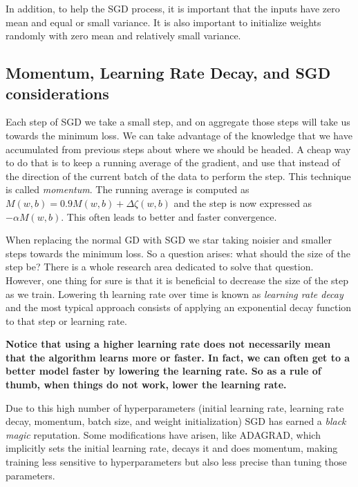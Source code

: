 \documentclass[english, 11pt]{article}
\begin{document}
	In addition, to help the \ac{SGD} process, it is important that the inputs have zero mean and equal or small variance. It is also important to initialize weights randomly with zero mean and relatively small variance.

	\subsection{Momentum, Learning Rate Decay, and SGD considerations}

	Each step of \ac{SGD} we take a small step, and on aggregate those steps will take us towards the minimum loss. We can take advantage of the knowledge that we have accumulated from previous steps about where we should be headed. A cheap way to do that is to keep a running average of the gradient, and use that instead of the direction of the current batch of the data to perform the step. This technique is called \emph{momentum}. The running average is computed as $M(w,b) = 0.9M(w,b) + \Delta\zeta(w,b)$ and the step is now expressed as $-\alpha M(w,b)$. This often leads to better and faster convergence.

	When replacing the normal \ac{GD} with \ac{SGD} we star taking noisier and smaller steps towards the minimum loss. So a question arises: what should the size of the step be? There is a whole research area dedicated to solve that question. However, one thing for sure is that it is beneficial to decrease the size of the step as we train. Lowering th learning rate over time is known as \emph{learning rate decay} and the most typical approach consists of applying an exponential decay function to that step or learning rate.

	\textbf{Notice that using a higher learning rate does not necessarily mean that the algorithm learns more or faster. In fact, we can often get to a better model faster by lowering the learning rate. So as a rule of thumb, when things do not work, lower the learning rate.}

	Due to this high number of hyperparameters (initial learning rate, learning rate decay, momentum, batch size, and weight initialization) \ac{SGD} has earned a \textit{black magic} reputation. Some modifications have arisen, like ADAGRAD, which implicitly sets the initial learning rate, decays it and does momentum, making training less sensitive to hyperparameters but also less precise than tuning those parameters.

  
\end{document}

